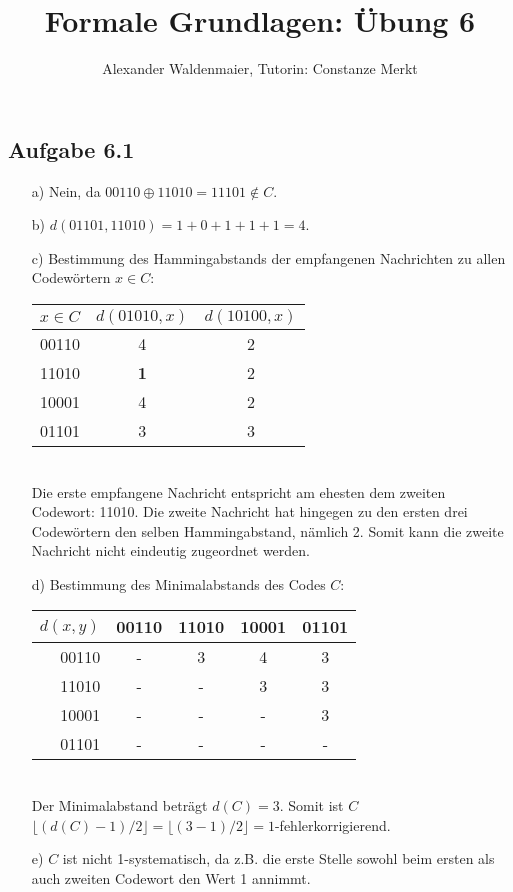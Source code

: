 \documentclass{article}
\title{Formale Grundlagen: Übung 6}
\author{Alexander Waldenmaier, Tutorin: Constanze Merkt}
\begin{document}
    \maketitle

    \subsection*{Aufgabe 6.1}
    \begin{enumerate}
        \item[a)] Nein, da $00110 \oplus 11010 = 11101 \notin C$. 
        \item[b)] $d(01101, 11010) = 1+0+1+1+1 = 4$. 
        \item[c)] Bestimmung des Hammingabstands der empfangenen Nachrichten zu allen Codewörtern $x \in C$: 
        \begin{table*}[h]
            \centering
            \begin{tabular}{r|cc}
                $x\in C$ & $d(01010, x)$ & $d(10100,x)$ \\ \hline
                00110    & 4             & 2     \\
                11010    & \textbf{1}    & 2     \\ 
                10001    & 4             & 2     \\ 
                01101    & 3             & 3
            \end{tabular}
        \end{table*}\\
        Die erste empfangene Nachricht entspricht am ehesten dem zweiten Codewort: 11010. Die zweite Nachricht hat hingegen zu den ersten drei Codewörtern den selben Hammingabstand, nämlich 2. Somit kann die zweite Nachricht nicht eindeutig zugeordnet werden.
        \item[d)] Bestimmung des Minimalabstands des Codes $C$: 
        \begin{table*}[h]
            \centering
            \begin{tabular}{r|cccc}
                $d(x,y)$ & 00110 & 11010 & 10001 & 01101 \\ \hline
                00110    & -     & 3     & 4     & 3     \\
                11010    & -     & -     & 3     & 3     \\
                10001    & -     & -     & -     & 3     \\
                01101    & -     & -     & -     & -     
            \end{tabular}
        \end{table*}\\
        Der Minimalabstand beträgt $d(C) = 3$. Somit ist $C$ $\lfloor(d(C)-1)/2\rfloor = \lfloor (3-1)/2\rfloor = 1$-fehlerkorrigierend.
        \item[e)] $C$ ist nicht 1-systematisch, da z.B. die erste Stelle sowohl beim ersten als auch zweiten Codewort den Wert 1 annimmt. 


\end{enumerate}
\end{document}
